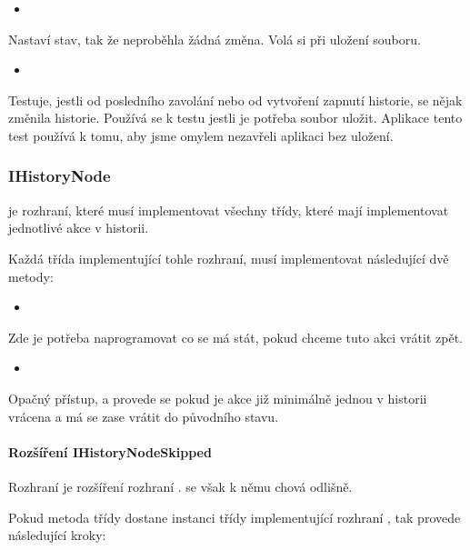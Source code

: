 \documentclass[
  field=inf,
  biblatex,
  glossaries,
  index
]{kidiplom}
\begin{document}
\begin{itemize}
\item {}
\end{itemize}
Nastaví stav, tak že neproběhla žádná změna. Volá si při uložení souboru.

\begin{itemize}
\item {}
\end{itemize}
Testuje, jestli od posledního zavolání  nebo od vytvoření zapnutí historie, se nějak změnila historie. Používá se k testu jestli je potřeba soubor uložit. Aplikace tento test používá k tomu, aby jsme omylem nezavřeli aplikaci bez uložení.

\subsubsection{IHistoryNode}
 je rozhraní, které musí implementovat všechny třídy, které mají implementovat jednotlivé akce v historii.

Každá třída implementující tohle rozhraní, musí implementovat následující dvě metody:

\begin{itemize}
\item {}
\end{itemize}
Zde je potřeba naprogramovat co se má stát, pokud chceme tuto akci vrátit zpět.

\begin{itemize}
\item {}
\end{itemize}
Opačný přístup, a provede se pokud je akce již minimálně jednou v historii vrácena a má se zase vrátit do původního stavu.

\paragraph{Rozšíření IHistoryNodeSkipped}
Rozhraní  je rozšíření rozhraní .  se však k němu chová odlišně.

Pokud metoda  třídy  dostane instanci třídy implementující rozhraní , tak provede následující kroky:
\end{document}

